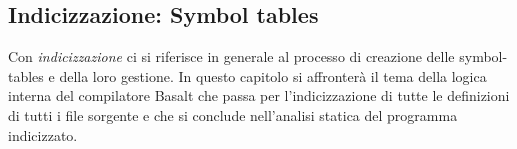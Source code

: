\subsection{Indicizzazione: Symbol tables}
Con \textit{indicizzazione} ci si riferisce in generale al processo di creazione delle symbol-tables
e della loro gestione. In questo capitolo si affronterà il tema della logica interna 
del compilatore Basalt che passa per l'indicizzazione di tutte le definizioni di tutti i file 
sorgente e che si conclude nell'analisi statica del programma indicizzato. \\


\newpage


\newpage


\newpage


\newpage


\newpage


\newpage
